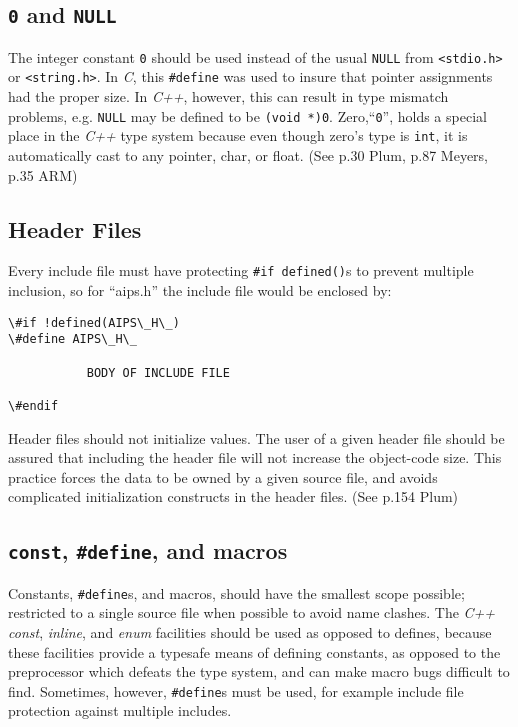 \subsection{\texttt{0} and \texttt{NULL}}
The integer constant \texttt{0} should be used instead of the usual \texttt{NULL} from
\texttt{<stdio.h>} or \texttt{<string.h>}. In \emph{C}, this \texttt{\#define} was used to insure
that pointer assignments had the proper size. In \emph{C++}, however, this can 
result in type mismatch problems, e.g. \texttt{NULL} may be defined to be 
\texttt{(void *)0}. Zero,``\texttt{0}'', holds a special place in the \emph{C++} type 
system because even though zero's type is \texttt{int}, it is automatically cast to 
any pointer, char, or float. (See p.30 Plum, p.87 Meyers, p.35 ARM)

\subsection{Header Files}
Every include file must have protecting \texttt{\#if defined()}s 
to prevent multiple inclusion, so for ``aips.h'' the include file would be 
enclosed by:
\begin{verbatim}
\#if !defined(AIPS\_H\_)
\#define AIPS\_H\_

           BODY OF INCLUDE FILE

\#endif
\end{verbatim}

Header files should not initialize values. The user of a given header file should
be assured that including the header file will not increase the object-code
size. This practice forces the data to be owned by a given source file, and
avoids complicated initialization constructs in the header 
files. (See p.154 Plum)


\subsection{\texttt{const}, \texttt{\#define}, and macros}
Constants, \texttt{\#define}s, and macros, should have the smallest scope possible;
restricted to a single source file when possible to avoid name clashes.
The \emph{C++} \emph{const}, \emph{inline}, and \emph{enum} facilities 
should be used as opposed to defines, because these facilities provide a 
typesafe means of defining constants, as opposed to the preprocessor which 
defeats the type system, and can make macro bugs difficult to find. 
Sometimes, however, \texttt{\#define}s must be used, for example include file 
protection against multiple includes.

